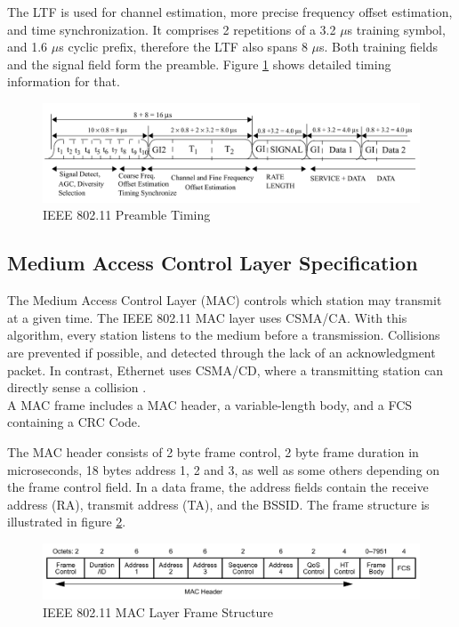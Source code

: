 The \gls{LTF} is used for channel estimation, more precise frequency offset estimation, and time synchronization. It comprises 2 repetitions of a 3.2 $\mu$s training symbol, and 1.6 $\mu$s cyclic prefix, therefore the \gls{LTF} also spans 8 $\mu$s. Both training fields and the signal field form the preamble. Figure \ref{fig:preamble} shows detailed timing information for that.

\begin{figure}[H]
	\centering
	\includegraphics[width=\textwidth]{gfx/images/preamble-format}
	\caption[IEEE 802.11 Preamble Timing]{IEEE 802.11 Preamble Timing \cite{ieee2012}}
	\label{fig:preamble}
\end{figure}


\subsection{Medium Access Control Layer Specification} \label{sec:mac-format}

The Medium Access Control Layer (MAC) controls which station may transmit at a given time. The \gls{IEEE} 802.11 \gls{MAC} layer uses \gls{CSMA/CA}. With this algorithm, every station listens to the medium before a transmission. Collisions are prevented if possible, and detected through the lack of an acknowledgment packet. In contrast, Ethernet uses \gls{CSMA/CD}, where a transmitting station can directly sense a collision \cite{ieee802-3}.\\

A \gls{MAC} frame includes a \gls{MAC} header, a variable-length body, and a \gls{FCS} containing a \gls{CRC} Code.

The \gls{MAC} header consists of 2 byte frame control, 2 byte frame duration in microseconds, 18 bytes address 1, 2 and 3, as well as some others depending on the frame control field. In a data frame, the address fields contain the receive address (RA), transmit address (TA), and the \gls{BSSID}. The frame structure is illustrated in figure \ref{fig:mac-format}.

\begin{figure}[H]
	\centering
	\includegraphics[width=\textwidth]{gfx/images/mac-format}
	\caption[IEEE 802.11 MAC Layer Frame Structure]{IEEE 802.11 MAC Layer Frame Structure \cite{ieee2012}}
	\label{fig:mac-format}
\end{figure}


